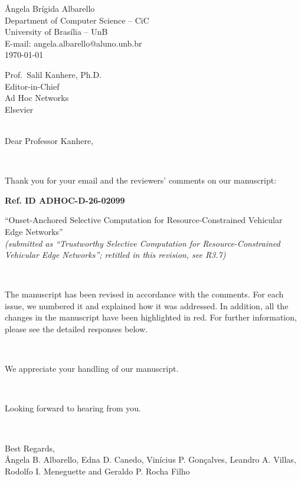 \documentclass[1p,12pt,authoryear]{elsarticle}
\begin{document}
\begin{flushright}
\^Angela Br\'igida Albarello \\
Department of Computer Science -- CiC \\
University of Bras\'ilia -- UnB \\
E-mail: angela.albarello@aluno.unb.br \\
\today \\
\end{flushright}

\noindent Prof.\ Salil Kanhere, Ph.D. \\
\noindent Editor-in-Chief \\
\noindent Ad Hoc Networks \\
\noindent Elsevier \\

~

\noindent Dear Professor Kanhere,

~

\noindent Thank you for your email and the reviewers' comments on our manuscript:

\begin{center}
\textbf{Ref. ID ADHOC-D-26-02099}

``Onset-Anchored Selective Computation for Resource-Constrained Vehicular Edge Networks''\\[2pt]
{\normalsize\itshape (submitted as ``Trustworthy Selective Computation for Resource-Constrained Vehicular Edge Networks''; retitled in this revision, see R3.7)}
\end{center}

~

\noindent The manuscript has been revised in accordance with the comments. For each issue, we numbered it and explained how it was addressed. In addition, all the changes in the manuscript have been highlighted in red. For further information, please see the detailed responses below.

~

\noindent We appreciate your handling of our manuscript.

~

\noindent Looking forward to hearing from you.

~

\noindent Best Regards,\\
\noindent \^Angela B. Albarello, Edna D. Canedo, Vin\'icius P. Gon\c{c}alves, Leandro A. Villas, Rodolfo I. Meneguette and Geraldo P. Rocha Filho
\end{document}
